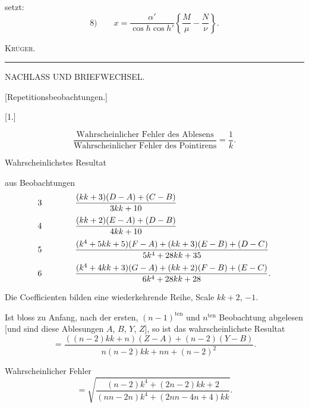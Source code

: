 \noindent setzt:
\[
\text{8)}\qquad x=\frac{\alpha'}{\cos h\cos h'}\left\{\frac M\mu-\frac N\nu\right\}.
\]
\begin{flushright}\textsc{Krüger.}\end{flushright}
\par\endgroup
\begin{center}\rule{3.5cm}{.4pt}\end{center}
\noindent{}\par

\par\clearpage
\begin{center}
{\Large NACHLASS UND BRIEFWECHSEL.}\par\vspace{1cm}
{\large [Repetitionsbeobachtungen.]}\par\bigskip
{[}1.]
\end{center}
\[
\frac{\text{Wahrscheinlicher Fehler des Ablesens}}{\text{Wahrscheinlicher Fehler des Pointirens}}=\frac1k.
\]
\begin{center}Wahrscheinlichstes Resultat\end{center}
\noindent aus Beobachtungen
\[
\begin{array}{c@{\qquad\qquad}l}
3&\dfrac{(kk+3)(D-A)+(C-B)}{3kk+10}\\[10pt]
4&\dfrac{(kk+2)(E-A)+(D-B)}{4kk+10}\\[10pt]
5&\dfrac{(k^4+5kk+5)(F-A)+(kk+3)(E-B)+(D-C)}{5k^4+28kk+35}\\[10pt]
6&\dfrac{(k^4+4kk+3)(G-A)+(kk+2)(F-B)+(E-C)}{6k^4+28kk+28}.
\end{array}
\]
\par\noindent\hspace*{\parindent}Die Coefficienten bilden eine wiederkehrende Reihe, Scale $kk+2$, $-1$.
\par\bigskip\noindent\hspace*{\parindent}Ist bloss zu Anfang, nach der ersten, $(n-1)^{\text{ten}}$ und $n^{\text{ten}}$ Beobachtung abgelesen [und sind diese Ablesungen $A$, $B$, $Y$, $Z$], so ist das wahrscheinlichste Resultat
\[
=\frac{((n-2)kk+n)(Z-A)+(n-2)(Y-B)}{n(n-2)kk+nn+(n-2)^2}.
\]
\par\noindent\hspace*{\parindent}Wahrscheinlicher Fehler
\[
=\sqrt{\frac{(n-2)k^4+(2n-2)kk+2}{(nn-2n)k^4+(2nn-4n+4)kk}}.
\]

